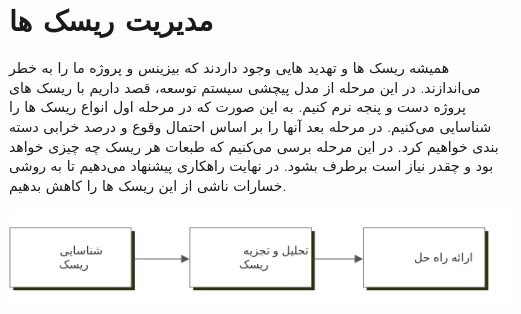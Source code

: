 \section{مدیریت ریسک ها}
همیشه ریسک ها و تهدید هایی وجود داردند که بیزینس و پروژه ما را به خطر می‌اندازند. در این مرحله از مدل پیچشی سیستم توسعه، قصد داریم با ریسک های 
پروژه دست و پنجه نرم کنیم.
به این صورت که در مرحله اول انواع ریسک ها را شناسایی می‌کنیم.
در مرحله بعد آنها را بر اساس احتمال وقوع و درصد خرابی دسته بندی خواهیم کرد. در این مرحله برسی می‌کنیم که طبعات هر ریسک چه چیزی خواهد بود و چقدر نیاز است برطرف بشود.
در نهایت راهکاری پیشنهاد می‌دهیم تا به روشی خسارات ناشی از این ریسک ها را کاهش بدهیم.

\includegraphics{assets/risk_management.png}
